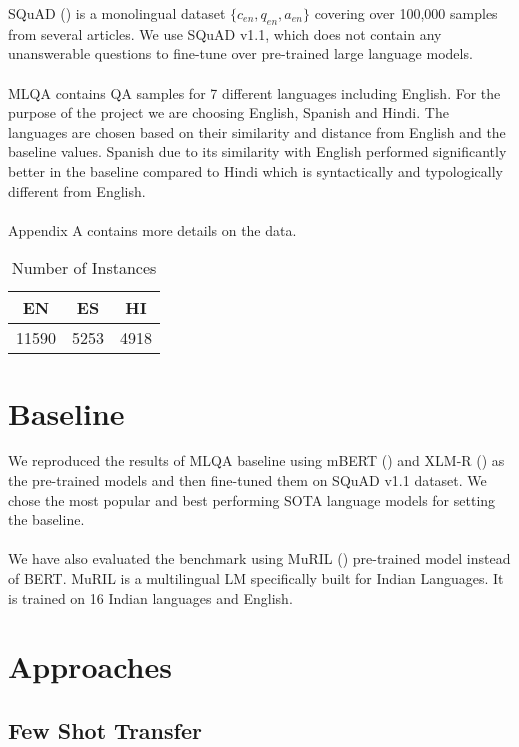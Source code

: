 \documentclass[12pt]{article}   %
\begin{document}
SQuAD (\cite{rajpurkar2016squad}) is a monolingual dataset $\{c_{en}, q_{en}, a_{en}\}$ covering over 100,000 samples from several articles. We use SQuAD v1.1, which does not contain any unanswerable questions to fine-tune over pre-trained large language models.
\\ \\
MLQA contains QA samples for 7 different languages including English. For the purpose of the project we are choosing English, Spanish and Hindi. The languages are chosen based on their similarity and distance from English and the baseline values. Spanish due to its similarity with English performed significantly better in the baseline compared to Hindi which is syntactically and typologically different from English. \\ \\ Appendix A contains more details on the data.

 \begin{table}[h]
            \centering
		\begin{tabular}{|c|c|c|}
			\hline
 			 \textbf{EN} &  \textbf{ES} &  \textbf{HI} \\
			\hline
			 11590 & 5253 & 4918 \\
			\hline
		\end{tabular}
		\caption{Number of Instances}

\end{table}

\section{Baseline}
 
We reproduced the results of MLQA baseline using mBERT (\cite{devlin2018bert}) and XLM-R (\cite{lample2019cross}) as the pre-trained models and then fine-tuned them on SQuAD v1.1 dataset. We chose the most popular and best performing SOTA language models for setting the baseline.
\\ \\
We have also evaluated the benchmark using MuRIL (\cite{muril}) pre-trained model instead of BERT. MuRIL is a multilingual LM specifically built for Indian Languages. It is trained on 16 Indian languages and English. 

\section{Approaches}

\subsection{Few Shot Transfer}
\end{document}
